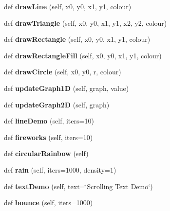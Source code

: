 \begin{DoxyCompactItemize}
def {\bfseries draw\+Line} (self, x0, y0, x1, y1, colour)
\item 
\mbox{\label{classglowbit_1_1glowbitMatrix_ac0b08486a62b6bd9c8633287d2725f43}} 
def {\bfseries draw\+Triangle} (self, x0, y0, x1, y1, x2, y2, colour)
\item 
\mbox{\label{classglowbit_1_1glowbitMatrix_ad70235a976475054af4ccb534a32b5e7}} 
def {\bfseries draw\+Rectangle} (self, x0, y0, x1, y1, colour)
\item 
\mbox{\label{classglowbit_1_1glowbitMatrix_ad91952585c61527ae5c0ac4a170435bf}} 
def {\bfseries draw\+Rectangle\+Fill} (self, x0, y0, x1, y1, colour)
\item 
\mbox{\label{classglowbit_1_1glowbitMatrix_a4efec5ce17c30403505b1f2775022e90}} 
def {\bfseries draw\+Circle} (self, x0, y0, r, colour)
\item 
\mbox{\label{classglowbit_1_1glowbitMatrix_a0d44976cdc12728d9ae80c2d901029c0}} 
def {\bfseries update\+Graph1D} (self, graph, value)
\item 
\mbox{\label{classglowbit_1_1glowbitMatrix_aaf5d23a0ed51901ffd78dfae985fbc7f}} 
def {\bfseries update\+Graph2D} (self, graph)
\item 
\mbox{\label{classglowbit_1_1glowbitMatrix_a0071fd8471e5f519586f6fdd86f8d7f3}} 
def {\bfseries line\+Demo} (self, iters=10)
\item 
\mbox{\label{classglowbit_1_1glowbitMatrix_a69370ec1479b4887fca517fbefd92e4c}} 
def {\bfseries fireworks} (self, iters=10)
\item 
\mbox{\label{classglowbit_1_1glowbitMatrix_adf29bdb4294bcf27ae560130b0fcae35}} 
def {\bfseries circular\+Rainbow} (self)
\item 
\mbox{\label{classglowbit_1_1glowbitMatrix_a690a172f923caeb55e3adf012ec0600c}} 
def {\bfseries rain} (self, iters=1000, density=1)
\item 
\mbox{\label{classglowbit_1_1glowbitMatrix_a6232220b12c86c7ec361cde374419ac4}} 
def {\bfseries text\+Demo} (self, text=\char`\"{}Scrolling Text Demo\char`\"{})
\item 
\mbox{\label{classglowbit_1_1glowbitMatrix_a969352871a02db3d55bcabe5b5107574}} 
def {\bfseries bounce} (self, iters=1000)
\end{DoxyCompactItemize}
